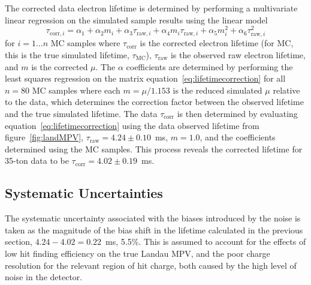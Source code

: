 \documentclass[10pt,a4paper]{article}
\begin{document}
The corrected data electron lifetime is determined by performing a multivariate linear regression on the simulated sample results using the linear model
\begin{equation}\label{eq:lifetimecorrection}
\tau_{\text{corr},i} = \alpha_1 + \alpha_2 m_i + \alpha_3 \tau_{\text{raw},i} + \alpha_4 m_i\tau_{\text{raw},i} + \alpha_5 m_i^2 + \alpha_6 \tau_{\text{raw},i}^2
\end{equation}
for $i=1...n$ MC samples where $\tau_{\text{corr}}$ is the corrected electron lifetime (for MC, this is the true simulated lifetime, $\tau_{\text{MC}}$), $\tau_{\text{raw}}$ is the observed raw electron lifetime, and $m$ is the corrected $\mu$. The $\alpha$ coefficients are determined by performing the least squares regression on the matrix equation~\ref{eq:lifetimecorrection} for all $n=80$ MC samples where each $m=\mu/1.153$ is the reduced simulated $\mu$ relative to the data, which determines the correction factor between the observed lifetime and the true simulated lifetime. The data $\tau_{\text{corr}}$ is then determined by evaluating equation~\ref{eq:lifetimecorrection} using the data observed lifetime from figure~\ref{fig:landMPV}, $\tau_{\text{raw}}=4.24\pm0.10$~ms, $m=1.0$, and the coefficients determined using the MC samples. This process reveals the corrected lifetime for 35-ton data to be $\tau_{\text{corr}}=4.02\pm0.19$~ms.

\subsection{Systematic Uncertainties}\label{sec:lifetimesystematics}

The systematic uncertainty associated with the biases introduced by the noise is taken as the magnitude of the bias shift in the lifetime calculated in the previous section, $4.24-4.02=0.22$~ms, 5.5\%. This is assumed to account for the effects of low hit finding efficiency on the true Landau MPV, and the poor charge resolution for the relevant region of hit charge, both caused by the high level of noise in the detector.
\end{document}
